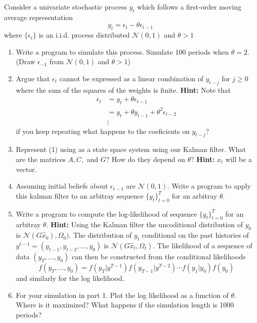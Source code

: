 \documentclass{exam}
\begin{document}
Consider a univariate stochastic process $y_t$ which follows a first-order moving average representation
\begin{equation}
	y_t = \epsilon_t - \theta\epsilon_{t-1}
\end{equation}where $\{\epsilon_t\}$ is an i.i.d. process distributed $\mathcal N(0,1)$ and $\theta > 1$

\begin{enumerate}
 	\item Write a program to simulate this process.  Simulate 100 periods when $\theta =2$. (Draw $\epsilon_{-1}$ from $\mathcal N(0,1)$ and $\theta > 1$)
 	\item Argue that $\epsilon_t$ cannot be expressed as a linear combination of $y_{t-j}$ for $j\geq0$ where the sum of the squares of the weights is finite. \textbf{Hint:} Note that 
 	\begin{align*}
 		\epsilon_t &= y_t + \theta\epsilon_{t-1}\\
 				   &= y_t + \theta y_{t-1} +\theta^2 \epsilon_{t-2}\\
 				   &\vdots
 	\end{align*} 
 	if you keep repeating what happens to the coeficients on $y_{t-j}$?
 	\item Represent (1) using as a state space system using our Kalman filter.  What are the matrices $A,C,$ and $G$?  How do they depend on $\theta$? \textbf{Hint:} $x_t$ will be a vector.
 	\item Assuming initial beliefs about $\epsilon_{t-1}$ are $\mathcal N(0,1)$.  Write a program to apply this kalman filter to an arbitray sequence $\{y_t\}_{t=0}^T$ for an arbitray $\theta$.
 	\item Write a program to compute the log-likelihood of sequence $\{y_t\}_{t=0}^T$ for an arbitray $\theta$. \textbf{Hint: }  Using the Kalman filter the uncoditional distribution of $y_0$ is $\mathcal N(G\hat x_0),\Omega_0)$.  The distribution of $y_t$ conditional on the past histories of $y^{t-1}=(y_{t-1},y_{t-2},\ldots,y_0)$ is $\mathcal N(G\hat x_t,\Omega_t)$.  The likelihood of a sequence of data $(y_T,\ldots,y_0)$ can then be constructed from the conditional likelihoods
 	\begin{equation}
 		f(y_T,\ldots,y_0) = f(y_T|y^{T-1})f(y_{T-1}|y^{T-2})\cdots f(y_1|y_0)f(y_0)
 	\end{equation}
 	and similarly for the log likelihood.
 	\item For your simulation in part 1. Plot the log likelihood as a function of $\theta$.  Where is it maximized?  What happens if the simulation length is 1000 periods?
 \end{enumerate} 
\end{document}
